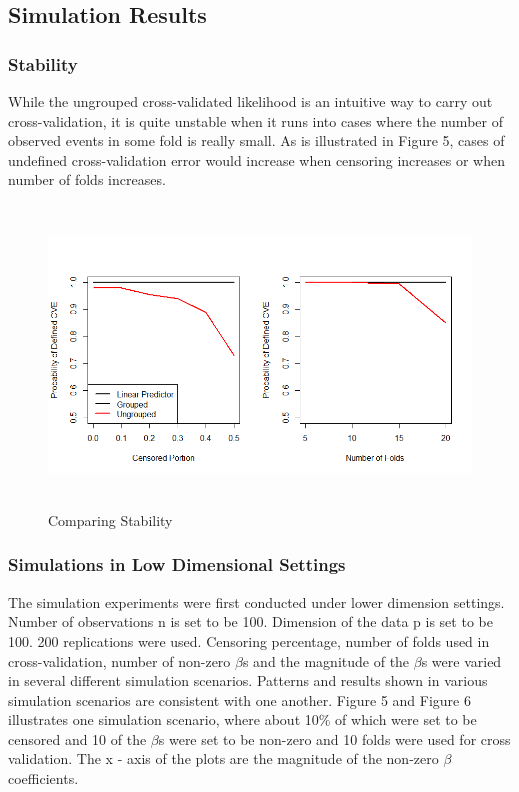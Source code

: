 \documentclass{article}\usepackage[]{graphicx}\usepackage[]{color}
\begin{document}
  \subsection{Simulation Results}
	
    \subsubsection {Stability}
   While the ungrouped cross-validated likelihood is an intuitive way to carry out cross-validation, it is quite unstable when it runs into cases where the number of observed events in some fold is really small. As is illustrated in Figure 5, cases of undefined cross-validation error would increase when censoring increases or when number of folds increases. 

\begin{figure}
    \centering
		\includegraphics[height= 8cm ]{./figures/stability2.png}
    \caption{Comparing Stability}
\end{figure}	
    
    
    \subsubsection {Simulations in Low Dimensional Settings}
    
   The simulation experiments were first conducted under lower dimension settings. Number of observations n is set to be 100. Dimension of the data p is set to be 100. 200 replications were used. Censoring percentage, number of folds used in cross-validation, number of non-zero $\beta$s and the magnitude of the $\beta$s were varied in several different simulation scenarios. Patterns and results shown in various simulation scenarios are consistent with one another. Figure 5 and Figure 6 illustrates one simulation scenario, where about 10$\%$ of which were set to be censored and 10 of the $\beta$s were set to be non-zero and 10 folds were used for cross validation. The x - axis of the plots are the magnitude of the non-zero $\beta$ coefficients. 
   
\end{document}
